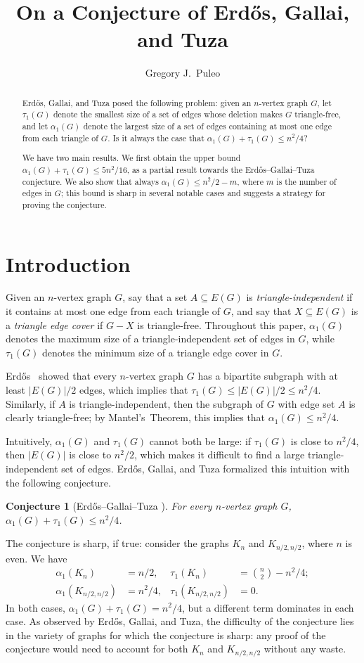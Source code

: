 \documentclass{amsart}
\title{On a Conjecture of Erd\H os, Gallai, and Tuza}
\author{Gregory J.~Puleo}
\renewcommand{\subset}{\subseteq}
\newcommand{\sizeof}[1]{\left\lvert{#1}\right\rvert}
\newcommand{\aph}{\alpha_1}
\let\oldtau\tau
\renewcommand{\tau}{\oldtau_1}
\newtheorem{conjecture}[proposition]{Conjecture}
\theoremstyle{definition}
\theoremstyle{remark}
\begin{document}
\begin{abstract}
  Erd\H os, Gallai, and Tuza posed the following problem: given an
  $n$-vertex graph $G$, let $\tau(G)$ denote the smallest size of a
  set of edges whose deletion makes $G$ triangle-free, and let
  $\aph(G)$ denote the largest size of a set of edges containing at
  most one edge from each triangle of $G$. Is it always the case that
  $\aph(G) + \tau(G) \leq n^2/4$?

  We have two main results. We first obtain the upper bound $\aph(G) +
  \tau(G) \leq 5n^2/16$, as a partial result towards the Erd\H
  os--Gallai--Tuza conjecture.  We also show that always $\aph(G) \leq
  n^2/2 - m$, where $m$ is the number of edges in $G$; this bound is
  sharp in several notable cases and suggests a strategy for proving
  the conjecture.
\end{abstract}
\maketitle
\section{Introduction}
Given an $n$-vertex graph $G$, say that a set $A \subset E(G)$ is
\emph{triangle-independent} if it contains at most one edge from each
triangle of $G$, and say that $X \subset E(G)$ is a \emph{triangle
  edge cover} if $G-X$ is triangle-free. Throughout this paper,
$\aph(G)$ denotes the maximum size of a triangle-independent set
of edges in $G$, while $\tau(G)$ denotes the minimum size of a triangle
edge cover in $G$.

Erd\H os~\cite{largebip} showed that every $n$-vertex graph $G$ has a
bipartite subgraph with at least $\sizeof{E(G)}/2$ edges, which implies that
$\tau(G) \leq \sizeof{E(G)}/2 \leq n^2/4$. Similarly, if $A$ is
triangle-independent, then the subgraph of $G$ with edge set $A$ is
clearly triangle-free; by Mantel's~Theorem, this implies that $\aph(G)
\leq n^2/4$.

Intuitively, $\aph(G)$ and $\tau(G)$ cannot both be large: if
$\tau(G)$ is close to $n^2/4$, then $\sizeof{E(G)}$ is close to
$n^2/2$, which makes it difficult to find a large triangle-independent
set of edges. Erd\H os, Gallai, and Tuza formalized this intuition
with the following conjecture.
\begin{conjecture}[Erd\H os--Gallai--Tuza \cite{EGT}]\label{coj:EGT}
  For every $n$-vertex graph $G$, $\aph(G) + \tau(G) \leq n^2/4$.
\end{conjecture}
The conjecture is sharp, if true: consider the graphs $K_{n}$ and
$K_{n/2, n/2}$, where $n$ is even. We have
\begin{align*}
  \aph(K_n) &= n/2, & \tau(K_{n}) &= {n \choose 2} - n^2/4; \\
  \aph(K_{n/2, n/2}) &= n^2/4, & \tau(K_{n/2,n/2}) &= 0.
\end{align*}
In both cases, $\aph(G) + \tau(G) = n^2/4$, but a different term
dominates in each case. As observed by Erd\H os, Gallai, and Tuza, the
difficulty of the conjecture lies in the variety of graphs for which
the conjecture is sharp: any proof of the conjecture would need to
account for both $K_n$ and $K_{n/2,n/2}$ without any waste.
\end{document}
